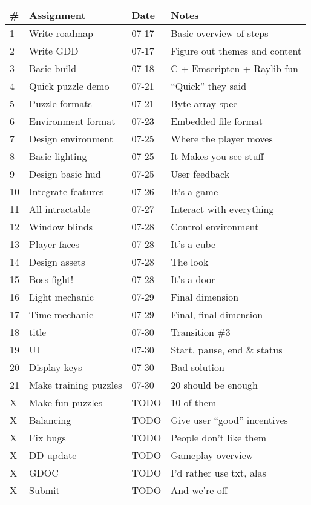 \documentclass[12pt, letterpaper]{article}
\begin{document}
\bgroup
\def\arraystretch{1.5}
\begin{tabular}{ R{0.4cm} p{4cm} p{1.5cm} p{5.5cm} }
\toprule
{} & \textbf{Assignment} & \textbf{Date} & \textbf{Notes} \\ 
 & Write roadmap & 07-17 & Basic overview of steps \\
2 & Write GDD & 07-17 & Figure out themes and content \\
3 & Basic build & 07-18 & C + Emscripten + Raylib fun \\
4 & Quick puzzle demo & 07-21 & ``Quick'' they said \\
5 & Puzzle formats & 07-21 & Byte array spec \\
6 & Environment format & 07-23 & Embedded file format \\
7 & Design environment & 07-25 & Where the player moves \\
8 & Basic lighting & 07-25 & It Makes you see stuff \\
9 & Design basic hud & 07-25 & User feedback \\
10 & Integrate features & 07-26 & It's a game \\
11 & All intractable & 07-27 & Interact with everything \\
12 & Window blinds & 07-28 & Control environment \\
13 & Player faces & 07-28 & It's a cube \\
14 & Design assets & 07-28 & The look \\
15 & Boss fight! & 07-28 & It's a door \\

16 & Light mechanic & 07-29 & Final dimension \\
17 & Time mechanic & 07-29 & Final, final dimension \\

18 & title & 07-30 & Transition \#3 \\
19 & UI & 07-30 & Start, pause, end \& status \\
20 & Display keys & 07-30 & Bad solution \\
21 & Make training puzzles & 07-30 & 20 should be enough \\

X & Make fun puzzles  & TODO & 10 of them \\

X & Balancing & TODO & Give user ``good'' incentives \\
X & Fix bugs & TODO & People don't like them \\

X & DD update & TODO & Gameplay overview \\
X & GDOC & TODO & I'd rather use txt, alas \\
X & Submit & TODO & And we're off \\



\bottomrule
\end{tabular}
\egroup

\end{document}
